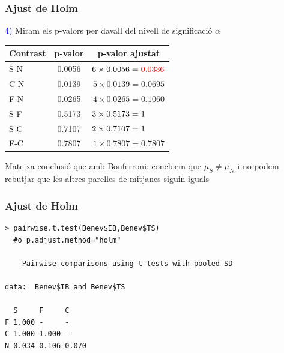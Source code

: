 \documentclass[12pt,t]{beamer}
\newcommand{\red}[1]{\textcolor{red}{#1}}
\newcommand{\blue}[1]{\textcolor{blue}{#1}}
\theoremstyle{plain}
\theoremstyle{definition}
\begin{document}
\begin{frame}
\frametitle{Ajust de Holm}

\blue{4)} Miram els p-valors per davall del nivell de significació $\alpha$

\begin{center}
\begin{tabular}{l|cc}
Contrast & p-valor & p-valor ajustat\\ \hline
S-N & 0.0056 & $6\times 0.0056=\red{0.0336} $\\
C-N & 0.0139& $5\times 0.0139=0.0695 $\\
F-N & 0.0265& $4\times 0.0265=0.1060 $\\
S-F & 0.5173& $3\times 0.5173=1\hphantom{.5519} $\\
S-C & 0.7107& $2\times 0.7107=1\hphantom{.5519} $\\
F-C &0.7807& $1\times 0.7807=0.7807$\\
\end{tabular}
\end{center}

Mateixa conclusió que amb Bonferroni: concloem que $\mu_S\neq \mu_N$  i no podem rebutjar que les altres parelles de mitjanes siguin iguals

\end{frame}




\begin{frame}[fragile]
\frametitle{Ajust de Holm}

\begin{lstlisting}
> pairwise.t.test(Benev$IB,Benev$TS)  
  #o p.adjust.method="holm"

	Pairwise comparisons using t tests with pooled SD 

data:  Benev$IB and Benev$TS 

  S     F     C    
F 1.000 -     -    
C 1.000 1.000 -    
N 0.034 0.106 0.070
\end{lstlisting}

\end{frame}
\end{document}
